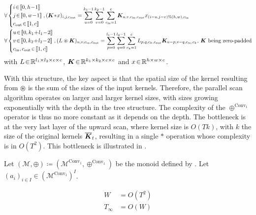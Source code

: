 \documentclass{article}
\begin{document}
\begin{align*}
    & \forall \left\{
\begin{aligned}
    &i\!\in\!\intint{0}{h\!-\!1}\\
    &j\!\in\!\intint{0}{w\!-\!1}\\
    &c_{\mathrm{out}}\!\in\!\intint{1}{c}
\end{aligned}
\right., (\Kmat\!\ast\!x)_{i,j,c_{\mathrm{out}}} = \sum_{u=0}^{k_1-1}\sum_{v=0}^{k_2-1}\sum_{c_{\mathrm{in}}=1}^{c} \Kmat_{u,v,c_{\mathrm{in}},c_{\mathrm{out}}} x_{(i-u,j-v)\%(h,w),c_{\mathrm{in}}}\\
    & \forall \left\{
\begin{aligned}
    &u\!\in\!\intint{0}{k_1\!+\!l_1\!-\!2}\\
    &v\!\in\!\intint{0}{k_2\!+\!l_2\!-\!2}\\
    &c_{\mathrm{in}},c_{\mathrm{out}}\!\in\!\intint{1}{c}
\end{aligned}
\right., (L \circledast \Kmat)_{u,v,c_{\mathrm{in}},c_{\mathrm{out}}} = \sum_{p=0}^{l_1-1}\sum_{q=0}^{l_2-1}\sum_{c_{k}=1}^{c} L_{p,q,c_{k},c_{\mathrm{out}}} \Kmat_{u-p,v-q,c_{\mathrm{in}},c_{k}}\text{, $\Kmat$ being zero-padded}
\end{align*}
\noindent with $L\!\in\!\mathbb{R}^{l_1\times l_2\times c \times c}$, $\bm{K}\!\in\!\mathbb{R}^{k_1\times k_2\times c \times c}$ and $x\!\in\!\mathbb{R}^{h \times w \times c}$.

With this structure, the key aspect is that the spatial size of the kernel resulting from $\circledast$ is the sum of the sizes of the input kernels. Therefore, the parallel scan algorithm operates on larger and larger kernel sizes, with sizes growing exponentially with the depth in the tree structure. The complexity of the $\oplus^{\mathrm{Conv}_1}$ operator is thus no more constant as it depends on the depth. The bottleneck is at the very last layer of the upward scan, where kernel size is $O(Tk)$, with $k$ the size of the original kernels $\overline{\bm{K}}_t$, resulting in a single $\ast$ operation whose complexity is in $O(T^2)$. This bottleneck is illustrated in .

\begin{proposition}
    Let $(\mathcal{M}, \oplus) \coloneqq (\mathcal{M}^{\mathrm{Conv}_1}, \oplus^{\mathrm{Conv}_1})$ be the monoid defined by . Let $(a_i)_{i\in I}\in (\mathcal{M}^{\mathrm{Conv}_1})^I$.

\begin{align}
    W&= O(T^2)\\
    T_\infty&= O(W)
\end{align}
\end{proposition}
\end{document}
